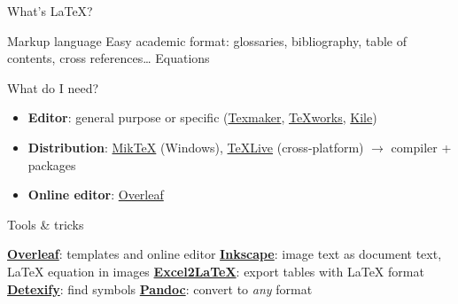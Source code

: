 
\begin{frame}{What's LaTeX?}
 \begin{fullpageitemize}
  \itemR Markup language
  \itemR Easy academic format: glossaries, bibliography, table of contents, cross references\ldots
  \itemR Equations
 \end{fullpageitemize}
\end{frame}

\begin{frame}{What do I need?}
 \begin{itemize}
  \item \textbf{Editor}: general purpose or specific (\href{http://www.xm1math.net/texmaker/}{Texmaker}, \href{https://www.tug.org/texworks/}{TeXworks}, \href{https://kile.sourceforge.io/}{Kile})
  
  \item \textbf{Distribution}: \href{https://miktex.org/}{MikTeX} (Windows), \href{https://tug.org/texlive/}{TeXLive} (cross-platform) $\rightarrow$ compiler + packages
 \end{itemize}
 \vspace{1ex}
 {\color{colororange}}
  \begin{itemize}
  \item \textbf{Online editor}: \href{https://www.overleaf.com/}{Overleaf}
 \end{itemize}
 
\end{frame}

\begin{frame}{Tools \& tricks}
 \begin{fullpageitemize}
  \itemR \href{https://www.overleaf.com/}{\textbf{Overleaf}}: templates and online editor
  \itemR \href{http://wiki.inkscape.org/wiki/index.php/LaTeX}{\textbf{Inkscape}}: image text as document text, LaTeX equation in images
  \itemR \href{https://www.ctan.org/tex-archive/support/excel2latex/}{\textbf{Excel2LaTeX}}: export tables with LaTeX format
  \itemR \href{http://detexify.kirelabs.org/classify.html}{\textbf{Detexify}}: find symbols
  \itemR \href{http://pandoc.org/}{\textbf{Pandoc}}: convert to \emph{any} format
 \end{fullpageitemize}
 
\end{frame}

